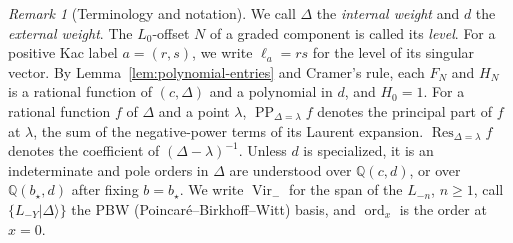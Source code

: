 \documentclass[twoside,10pt]{article}
\numberwithin{equation}{section}
\theoremstyle{slbody}
\theoremstyle{definition}
\theoremstyle{remark}
\newtheorem{remark}[theorem]{Remark}
\newcommand{\Vir}{\operatorname{Vir}}
\newcommand{\PP}{\operatorname{PP}}
\newcommand{\ord}{\operatorname{ord}}
\newcommand{\Res}{\operatorname{Res}}
\begin{document}
\begin{remark}[Terminology and notation]\label{rem:notation}
We call \(\Delta\) the \emph{internal weight} and \(d\) the \emph{external
weight}.  The \(L_0\)-offset \(N\) of a graded component is called its
\emph{level}.  For a positive Kac label \(a=(r,s)\), we write
\(\ell_a=rs\) for the level of its singular vector.
By Lemma~\ref{lem:polynomial-entries} and
Cramer's rule, each \(F_N\) and \(H_N\) is a rational function of
\((c,\Delta)\) and a polynomial in \(d\), and \(H_0=1\).  For a rational
function \(f\) of \(\Delta\) and a point \(\lambda\),
\(\PP_{\Delta=\lambda}f\) denotes the principal part of \(f\) at \(\lambda\),
the sum of the negative-power terms of its Laurent expansion.
\(\Res_{\Delta=\lambda}f\) denotes the coefficient of
\((\Delta-\lambda)^{-1}\).
Unless \(d\) is specialized, it is an indeterminate and pole
orders in \(\Delta\) are understood over \(\mathbb Q(c,d)\), or over
\(\mathbb Q(b_\star,d)\) after fixing \(b=b_\star\).  We write \(\Vir_-\) for the span
of the \(L_{-n}\), \(n\geq1\), call \(\{L_{-Y}\lvert\Delta\rangle\}\) the PBW
(Poincar\'e--Birkhoff--Witt) basis, and \(\ord_x\) is the order at \(x=0\).
\end{remark}
\end{document}
